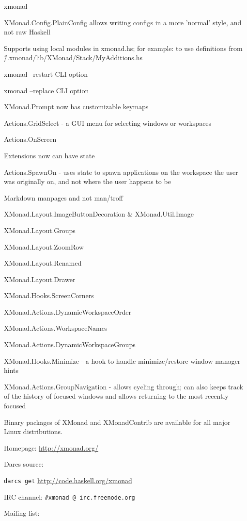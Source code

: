 \begin{hcarentry}{xmonad}
\item XMonad.Config.PlainConfig allows writing configs in a more 'normal' style, and not raw Haskell
\item Supports using local modules in xmonad.hs; for example: to use definitions from \~/.xmonad/lib/XMonad/Stack/MyAdditions.hs
\item xmonad --restart CLI option
\item xmonad --replace CLI option
\item XMonad.Prompt now has customizable keymaps
\item Actions.GridSelect - a GUI menu for selecting windows or workspaces
\item Actions.OnScreen
\item Extensions now can have state
\item Actions.SpawnOn - uses state to spawn applications on the workspace the user was originally on,
  and not where the user happens to be
\item Markdown manpages and not man/troff
\item  XMonad.Layout.ImageButtonDecoration & XMonad.Util.Image
\item XMonad.Layout.Groups
\item XMonad.Layout.ZoomRow
\item XMonad.Layout.Renamed
\item XMonad.Layout.Drawer
\item XMonad.Hooks.ScreenCorners
\item XMonad.Actions.DynamicWorkspaceOrder
\item XMonad.Actions.WorkspaceNames
\item XMonad.Actions.DynamicWorkspaceGroups
\item XMonad.Hooks.Minimize - a hook to handle minimize/restore window manager hints
\item XMonad.Actions.GroupNavigation - allows cycling through; can also keeps track of the
  history of focused windows and allows returning to the most recently focused

Binary packages of XMonad and XMonadContrib are available for all major Linux distributions.

\FurtherReading
\begin{compactitem}
\item Homepage:
 \url{http://xmonad.org/}

\item Darcs source:

 \texttt{darcs get} \url{http://code.haskell.org/xmonad}

\item IRC channel:
 \verb+#xmonad @ irc.freenode.org+

\item Mailing list:
\end{compactitem}
\end{hcarentry}